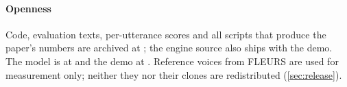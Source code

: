 \paragraph{Openness}
Code, evaluation texts, per-utterance scores and all scripts that produce the paper's numbers are archived at \zenodo;
the engine source also ships with the demo.
The model is at \hfmodel and the demo at \hfspace. Reference voices from FLEURS \citep{conneau2023fleurs} are used for
measurement only; neither they nor their clones are redistributed (\cref{sec:release}).
